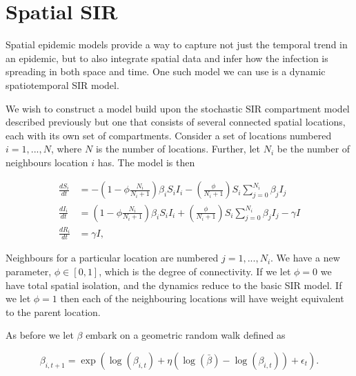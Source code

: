 

\section{Spatial SIR}

	Spatial epidemic models provide a way to capture not just the temporal trend in an epidemic, but to also integrate spatial data and infer how the infection is spreading in both space and time. One such model we can use is a dynamic spatiotemporal SIR model.

	We wish to construct a model build upon the stochastic SIR compartment model described previously but one that consists of several connected spatial locations, each with its own set of compartments. Consider a set of locations numbered $i = 1, ..., N$, where $N$ is the number of locations. Further, let $N_i$ be the number of neighbours location $i$ has. The model is then

	\begin{equation}
		\begin{aligned}
			\frac{dS_i}{dt} & = - \left( 1 - \phi \frac{N_i}{N_i + 1} \right) \beta_i S_i I_i - \left( \frac{\phi}{N_i + 1} \right) S_i \sum_{j = 0}^{N_i} \beta_j I_j \\
			\frac{dI_i}{dt} & = \left( 1 - \phi \frac{N_i}{N_i + 1} \right) \beta_i S_i I_i + \left( \frac{\phi}{N_i + 1} \right) S_i \sum_{j = 0}^{N_i} \beta_j I_j - \gamma I \\
			\frac{dR_i}{dt} & = \gamma I,
		\end{aligned}
	\end{equation}
    
	Neighbours for a particular location are numbered $j = 1, ..., N_i$. We have a new parameter, $\phi \in [0,1]$, which is the degree of connectivity. If we let $\phi = 0$ we have total spatial isolation, and the dynamics reduce to the basic SIR model. If we let $\phi = 1$ then each of the neighbouring locations will have weight equivalent to the parent location.

	As before we let $\beta$ embark on a geometric random walk defined as

	\begin{equation}
		\beta_{i, t+1} = \exp \left( \log(\beta_{i, t}) + \eta (\log(\bar{\beta}) - \log(\beta_{i, t})) + \epsilon_{t} \right).
	\end{equation}
	
